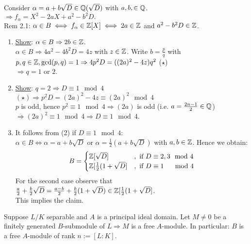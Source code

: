 \begin{Bew}
Consider $\alpha = a+b \sqrt{D} \in \mathbb{Q}(\sqrt{D})$ with $a,b, \in \mathbb{Q}$.\\
$\Rightarrow f_\alpha = X^2-2aX+a^2-b^2D.$\\
Rem 2.1: $\alpha \in B \iff f_\alpha \in \mathbb{Z}[X] \iff 2a \in \mathbb{Z}$ and $a^2-b^2D \in \mathbb{Z}$.
\begin{enumerate}[(1)]
\item \underline{Show}: $\alpha \in B \Rightarrow 2b \in \mathbb{Z}$.\\
$\alpha \in B \Rightarrow 4a^2-4b^2D = 4z$ with $z \in \mathbb{Z}$. Write $b= \frac{p}{q}$ with $p,q \in \mathbb{Z}, \gcd(p,q) =1 \\
\Rightarrow 4p^2D=((2a)^2-4z)q^2$ \quad ($\star$)\\
$\Rightarrow q=1 $ or $2$.
\item \underline{Show}: $q=2 \Rightarrow D \equiv 1 \mod 4$\\
$(\star) \Rightarrow p^2D= (2a)^2 -4z \equiv (2a)^2 \mod 4$\\
$p$ is odd, hence $p^2 \equiv 1 \mod 4 \Rightarrow (2a)$ is odd (i.e. $a=\frac{2n-1}{2} \in \mathbb{Q}$)\\ $\Rightarrow (2a)^2 \equiv 1 \mod 4 \Rightarrow D \equiv 1 \mod 4$.
\item It follows from (2) if $D \equiv 1 \mod 4$:\\
$\alpha \in B \iff \alpha = a +b \sqrt{D}$ or $\alpha = \frac{1}{2}(a +b \sqrt{D})$ with $a,b \in \mathbb{Z}$. Hence we obtain:
\begin{align*}
B= \begin{cases}
\mathbb{Z}[\sqrt{D}] &, \text{ if } D \equiv 2,3 \mod 4\\
\mathbb{Z}[\frac{1}{2}(1+ \sqrt{D}] &, \text{ if } D \equiv 1 \quad \mod 4
\end{cases}
\end{align*}
For the second case observe that $\frac{a}{2} + \frac{b}{2} \sqrt{D} = \frac{a-b}{2} + \frac{b}{2} (1+ \sqrt{D}) \in \mathbb{Z}[\frac{1}{2}(1+ \sqrt{D}]$.\\
 This implies the claim.
\end{enumerate}
\end{Bew}

\begin{Prop}
Suppose $L/K$ separable and $A$ is a principal ideal domain. Let $M \not = 0$ be a finitely generated $B$-submodule of $L \Rightarrow M$ is a free $A$-module. In particular: $B$ is a free $A$-module of rank $n:=[L:K]$.
\end{Prop}

